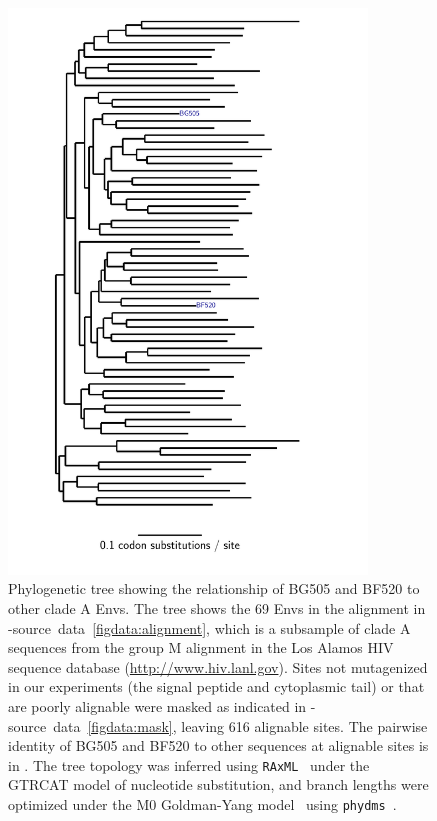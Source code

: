 \documentclass[9pt]{elife}
\begin{document}
\begin{figure}
\centerline{\includegraphics[clip=true, trim= 1in 0in 1.4in 0in, angle=-90, width=0.85\textwidth]{figures/tree_plot.pdf}}
\caption{\label{fig:tree}
Phylogenetic tree showing the relationship of BG505 and BF520 to other clade A Envs.
The tree shows the 69 Envs in the alignment in -source~data~\ref{figdata:alignment}, which is a subsample of clade A sequences from the group M alignment in the Los Alamos HIV sequence database (\url{http://www.hiv.lanl.gov}).
Sites not mutagenized in our experiments (the signal peptide and cytoplasmic tail) or that are poorly alignable were masked as indicated in -source~data~\ref{figdata:mask}, leaving 616 alignable sites.
The pairwise identity of BG505 and BF520 to other sequences at alignable sites is in .
The tree topology was inferred using \texttt{RAxML}~\citep{stamatakis2014raxml} under the GTRCAT model of nucleotide substitution, and branch lengths were optimized under the M0 Goldman-Yang model~\citep{yang2000codon} using \texttt{phydms}~\citep{hilton2017phydms}.
}
\end{figure}
\end{document}
